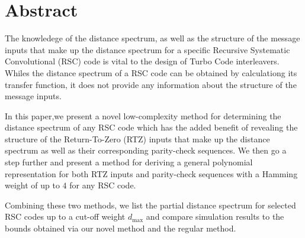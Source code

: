 \section{Abstract}
The knowledege of the distance spectrum, as well as the structure of the message inputs that make up the distance spectrum for a specific Recursive Systematic Convolutional (RSC) code is vital to the design of Turbo Code interleavers. Whiles the distance spectrum of a RSC code can be obtained by calculationg its transfer function, it does not provide any information about the structure of the message inputs. %

In this paper,we present a novel low-complexity method for determining the distance spectrum of any RSC code which has the added benefit of revealing the structure of the Return-To-Zero (RTZ) inputs that make up the distance spectrum as well as their corresponding parity-check sequences. 
We then go a step further and present a method  for deriving a general polynomial representation for both RTZ inputs and parity-check sequences with a Hamming weight of up to $4$ for any RSC code.
 
 Combining these two methods, we list the partial distance spectrum for selected RSC codes up to a cut-off weight $d_{\text{max}}$ and compare simulation results to the bounds obtained via our novel method and the regular method.
